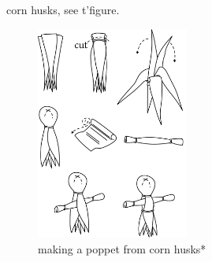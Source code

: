 corn husks, see t'\allowbreak figure.\begin{figure}\centering\includegraphics[width=5cm]{encyclopedia/poppet}\caption{making a poppet from corn husks*}\end{figure}
